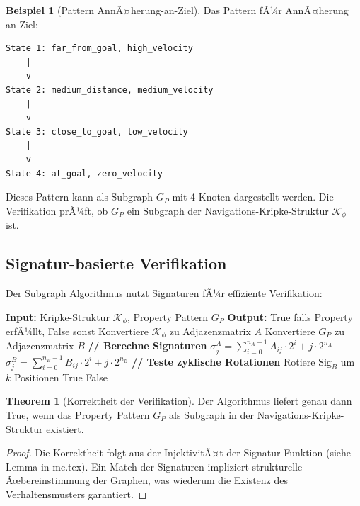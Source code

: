 ﻿\documentclass[a4paper,12pt]{article}
\theoremstyle{definition}
\newtheorem{beispiel}{Beispiel}[section]
\newtheorem{theorem}{Theorem}[section]
\begin{document}
\begin{beispiel}[Pattern AnnÃ¤herung-an-Ziel] Das Pattern fÃ¼r AnnÃ¤herung an Ziel:
\begin{verbatim}
State 1: far_from_goal, high_velocity
    |
    v
State 2: medium_distance, medium_velocity
    |
    v
State 3: close_to_goal, low_velocity
    |
    v
State 4: at_goal, zero_velocity
\end{verbatim}

Dieses Pattern kann als Subgraph $G_P$ mit 4 Knoten dargestellt werden. Die Verifikation prÃ¼ft, ob $G_P$ ein Subgraph der Navigations-Kripke-Struktur $\mathcal{K}_{\phi}$ ist.
\end{beispiel}

\subsection{Signatur-basierte Verifikation}

Der Subgraph Algorithmus nutzt Signaturen fÃ¼r effiziente Verifikation:

\begin{algorithm}
\caption{Verify Navigation Property}
\begin{algorithmic}[1]
\State \textbf{Input:} Kripke-Struktur $\mathcal{K}_{\phi}$, Property Pattern $G_P$
\State \textbf{Output:} True falls Property erfÃ¼llt, False sonst
\State 
\State Konvertiere $\mathcal{K}_{\phi}$ zu Adjazenzmatrix $A$
\State Konvertiere $G_P$ zu Adjazenzmatrix $B$
\State 
\State \textbf{// Berechne Signaturen}
    \State $\sigma_j^A = \sum_{i=0}^{n_A-1} A_{ij} \cdot 2^i + j \cdot 2^{n_A}$
\EndFor
{}
    \State $\sigma_j^B = \sum_{i=0}^{n_B-1} B_{ij} \cdot 2^i + j \cdot 2^{n_B}$
\EndFor
\State 
\State \textbf{// Teste zyklische Rotationen}
    \State Rotiere $\text{Sig}_B$ um $k$ Positionen
        \State \Return True
    \EndIf
\EndFor
\State \Return False
\end{algorithmic}
\end{algorithm}

\begin{theorem}[Korrektheit der Verifikation]
Der Algorithmus liefert genau dann True, wenn das Property Pattern $G_P$ als Subgraph in der Navigations-Kripke-Struktur existiert.
\end{theorem}

\begin{proof}
Die Korrektheit folgt aus der InjektivitÃ¤t der Signatur-Funktion (siehe Lemma in mc.tex). Ein Match der Signaturen impliziert strukturelle Ãœbereinstimmung der Graphen, was wiederum die Existenz des Verhaltensmusters garantiert.
\end{proof}
\end{document}
